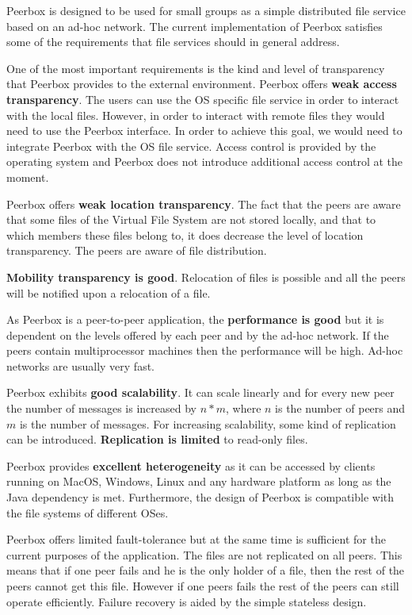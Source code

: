 
Peerbox is designed to be used for small groups as a simple distributed file service based on an ad-hoc network. The current implementation of Peerbox satisfies some of the requirements that file services should in general address.


One of the most important requirements is the kind and level of transparency that Peerbox provides to the external environment. Peerbox offers \textbf{weak access transparency}. The users can use the OS specific file service in order to interact with the local files. However, in order to interact with remote files they would need to use the Peerbox interface. In order to achieve this goal, we would need to integrate Peerbox with the OS file service.  Access control is provided by the operating system and Peerbox does not introduce additional access control at the moment.

Peerbox offers \textbf{weak location transparency}. The fact that the peers are aware that some files of the Virtual File System are not stored locally, and that to which members these files belong to, it does decrease the level of location transparency. The peers are aware of file distribution.

\textbf{Mobility transparency is good}. Relocation of files is possible and all the peers will be notified upon a relocation of a file. 


As Peerbox is a peer-to-peer application, the \textbf{performance is good} but it is dependent on the levels offered by each peer and by the ad-hoc network. If the peers contain multiprocessor machines then the performance will be high. Ad-hoc networks are usually very fast.


Peerbox exhibits \textbf{good scalability}. It can scale linearly and for every new peer the number of messages is increased by $n*m$, where $n$ is the number of peers and $m$ is the number of messages. For increasing scalability, some kind of replication can be introduced. \textbf{Replication is limited} to read-only files.



Peerbox provides \textbf{excellent heterogeneity} as it can be accessed by clients running on MacOS, Windows, Linux and any hardware platform as long as the Java dependency is met. Furthermore, the design of Peerbox is compatible with the file systems of different OSes.


Peerbox offers limited fault-tolerance but at the same time is sufficient for the current purposes of the application. The files are not replicated on all peers. This means that if one peer fails and he is the only holder of a file, then the rest of the peers cannot get this file. However if one peers fails the rest of the peers can still operate efficiently. Failure recovery is aided by the simple stateless design.


